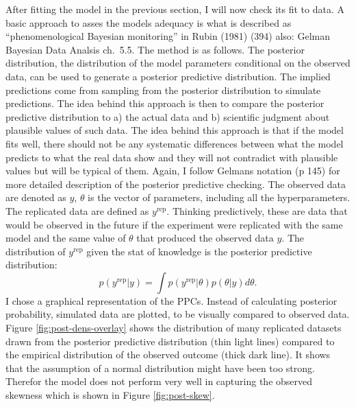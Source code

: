 \documentclass[a4, 12pt]{article}
\begin{document}
\label{sec:validation}
After fitting the model in the previous section, I will now check its fit to data. A basic approach to asses the models adequacy is what is described as ``phenomenological Bayesian monitoring'' in Rubin (1981) (394) also: Gelman Bayesian Data Analsis ch.~5.5. The method is as follows. The posterior distribution, the distribution of the model parameters conditional on the observed data, can be used to generate a posterior predictive distribution. The implied predictions come from sampling from the posterior distribution to simulate predictions. The idea behind this approach is then to compare the posterior predictive distribution to a) the actual data and b) scientific judgment about plausible values of such data. The idea behind this approach is that if the model fits well, there should not be any systematic differences between what the model predicts to what the real data show and they will not contradict with plausible values but will be typical of them. Again, I follow Gelmans notation (p 145) for more detailed description of the posterior predictive checking. The observed data are denoted as \(y\), \(\theta\) is the vector of parameters, including all the hyperparameters. The replicated data are defined as \(y^{\mathrm{rep}}\). Thinking predictively, these are data that would be observed in the future if the experiment were replicated with the same model and the same value of \(\theta\) that produced the observed data \(y\). The distribution of \(y^{\mathrm{rep}}\) given the stat of knowledge is the posterior predictive distribution:
\[p(y^{\mathrm{rep}}|y)=\int p(y^{\mathrm{rep}}|\theta)p(\theta|y)d\theta.\]
I chose a graphical representation of the PPCs. Instead of calculating posterior probability, simulated data are plotted, to be visually compared to observed data.
Figure \ref{fig:post-dens-overlay} shows the distribution of many replicated datasets drawn from the posterior predictive distribution (thin light lines) compared to the empirical distribution of the observed outcome (thick dark line). It shows that the assumption of a normal distribution might have been too strong. Therefor the model does not perform very well in capturing the observed skewness which is shown in Figure \ref{fig:post-skew}.
\end{document}
